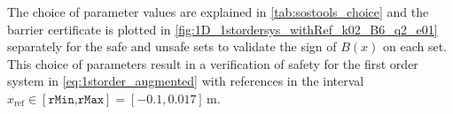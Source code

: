 


%

The choice of parameter values are explained in \autoref{tab:sostools_choice} and the barrier certificate is plotted in \autoref{fig:1D_1stordersys_withRef_k02_B6_q2_e01} separately for the safe and unsafe sets to validate the sign of $B(x)$ on each set. This choice of parameters result in a verification of safety for the first order system in \autoref{eq:1storder_augmented} with references in the interval $x_\text{ref}\in [\texttt{rMin,rMax}]=[-0.1,0.017]$\,m.

